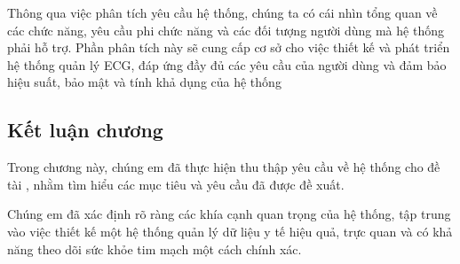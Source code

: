 Thông qua việc phân tích yêu cầu hệ thống, chúng ta có cái nhìn tổng quan về các chức năng, yêu cầu phi chức năng và 
các đối tượng người dùng mà hệ thống phải hỗ trợ. Phần phân tích này sẽ cung cấp cơ sở cho việc thiết kế và phát triển hệ thống quản lý ECG, 
đáp ứng đầy đủ các yêu cầu của người dùng và đảm bảo hiệu suất, bảo mật và tính khả dụng của hệ thống

\subsection{Kết luận chương}

Trong chương này, chúng em đã thực hiện thu thập yêu cầu về
 hệ thống cho đề tài , nhằm tìm hiểu
  các mục tiêu và yêu cầu đã được đề xuất.

Chúng em đã xác định rõ ràng các khía cạnh quan trọng của hệ thống,
 tập trung vào việc thiết kế một hệ thống quản lý dữ liệu y tế hiệu quả,
  trực quan và có khả năng theo dõi sức khỏe tim mạch một cách
   chính xác. 


\newpage
